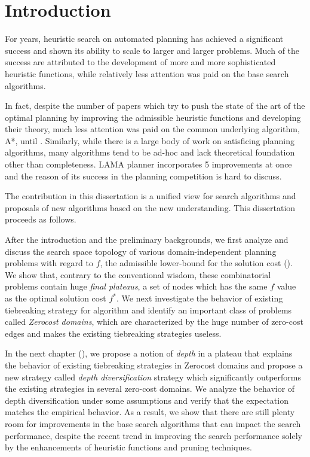 \chapter{Introduction}

For years, heuristic search on automated planning has achieved a
significant success and shown its ability to scale to larger and larger
problems. Much of the success are attributed to the development of
more and more sophisticated heuristic functions, while relatively less
attention was paid on the base search algorithms.

In fact, despite the number of papers which try to push the state of the art of the
optimal planning by improving the admissible heuristic functions and developing their theory, much
less attention was paid on the common underlying algorithm, A*, until \cite{Asai2016}.  Similarly, while
there is a large body of work on satisficing planning algorithms, many algorithms tend to be ad-hoc
and lack theoretical foundation other than completeness. \sota LAMA planner
\cite{richter2010lama} incorporates 5 improvements at once and the reason of its success in the
planning competition is hard to discuss.

The contribution in this dissertation is a unified view for search
algorithms and proposals of new algorithms based on the new
understanding. This dissertation proceeds as follows.
 
After the introduction and the preliminary backgrounds, we first analyze
and discuss the search space topology of various domain-independent
planning problems with regard to $f$, the admissible lower-bound for the
solution cost ().  We show that, contrary to the
conventional wisdom, these combinatorial problems contain huge
\emph{final plateaus}, a set of nodes which has the same $f$ value as the
optimal solution cost $f^*$.
We next investigate the behavior of existing
tiebreaking strategy for \astar algorithm and identify
an important class of problems called \emph{Zerocost domains}, which are
characterized by the huge number of zero-cost edges and makes the
existing tiebreaking strategies useless.

In the next chapter (),
we propose a notion of \emph{depth} in a plateau that explains the behavior of existing tiebreaking strategies
in Zerocost domains and 
propose a new strategy called \emph{depth diversification} strategy
which significantly outperforms the existing strategies in several
zero-cost domains.
We analyze the behavior of depth diversification under some assumptions and
verify that the expectation matches the empirical behavior.
% 
As a result, we show that there are still plenty room for improvements
in the base search algorithms that can impact the search performance,
despite the recent trend in improving the search performance solely by
the enhancements of heuristic functions and pruning techniques.

